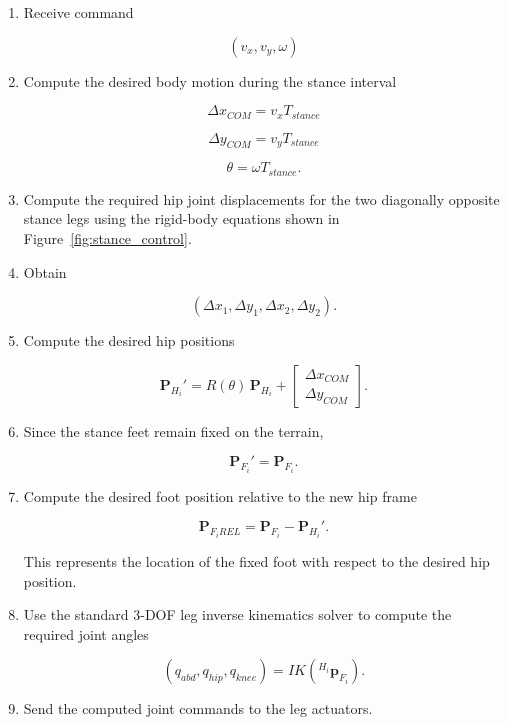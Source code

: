 \documentclass[11pt,a4paper]{report}
\begin{document}
\begin{enumerate}
\item Receive command

\[
(v_x,v_y,\omega)
\]

\item Compute the desired body motion during the stance interval

\[
\Delta x_{COM} = v_xT_{stance}
\]

\[
\Delta y_{COM}=v_yT_{stance}
\]

\[
\theta=\omega T_{stance}.
\]

\item Compute the required hip joint displacements for the two
diagonally opposite stance legs using the rigid-body equations shown in
Figure~\ref{fig:stance_control}.

\item Obtain

\[
(\Delta x_1,\Delta y_1,\Delta x_2,\Delta y_2).
\]

\item Compute the desired hip positions

\[
\mathbf{P}_{H_i}'
=
R(\theta)\,
\mathbf{P}_{H_i}
+
\begin{bmatrix}
\Delta x_{COM}\\
\Delta y_{COM}
\end{bmatrix}.
\]

\item Since the stance feet remain fixed on the terrain,

\[
\mathbf{P}_{F_i}'
=
\mathbf{P}_{F_i}.
\]

\item Compute the desired foot position relative to the new hip frame

\[
    \mathbf{P}_{F_iREL}
=
\mathbf{P}_{F_i}
-
\mathbf{P}_{H_i}'.
\]

This represents the location of the fixed foot with respect to the
desired hip position.

\item Use the standard 3-DOF leg inverse kinematics solver to compute
the required joint angles

\[
(q_{abd},q_{hip},q_{knee})
=
IK
\left(
{}^{H_i}\mathbf{p}_{F_i}
\right).
\]

\item Send the computed joint commands to the leg actuators.
\end{enumerate}
\end{document}

